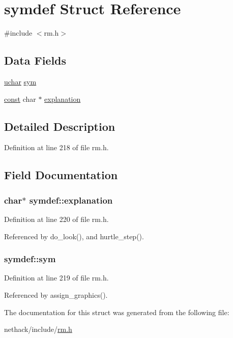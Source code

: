 \hypertarget{structsymdef}{\section{symdef Struct Reference}
\label{structsymdef}
}


{\ttfamily \#include $<$rm.\+h$>$}

\subsection*{Data Fields}
\begin{DoxyCompactItemize}
\item 
\hyperlink{config_8h_a65f85814a8290f9797005d3b28e7e5fc}{uchar} \hyperlink{structsymdef_a47b1c74b0ffd79968601f43ff89cda40}{sym}
\item 
\hyperlink{tradstdc_8h_a2c212835823e3c54a8ab6d95c652660e}{const} char $\ast$ \hyperlink{structsymdef_a58eceeee4a8a65f48f73975059a43314}{explanation}
\end{DoxyCompactItemize}


\subsection{Detailed Description}


Definition at line 218 of file rm.\+h.



\subsection{Field Documentation}
\hypertarget{structsymdef_a58eceeee4a8a65f48f73975059a43314}{
\subsubsection[{explanation}]{ char$\ast$ symdef\+::explanation}}\label{structsymdef_a58eceeee4a8a65f48f73975059a43314}


Definition at line 220 of file rm.\+h.



Referenced by do\+\_\+look(), and hurtle\+\_\+step().

\hypertarget{structsymdef_a47b1c74b0ffd79968601f43ff89cda40}{
\subsubsection[{sym}]{ symdef\+::sym}}\label{structsymdef_a47b1c74b0ffd79968601f43ff89cda40}


Definition at line 219 of file rm.\+h.



Referenced by assign\+\_\+graphics().



The documentation for this struct was generated from the following file\+:\begin{DoxyCompactItemize}
\item 
nethack/include/\hyperlink{rm_8h}{rm.\+h}\end{DoxyCompactItemize}
